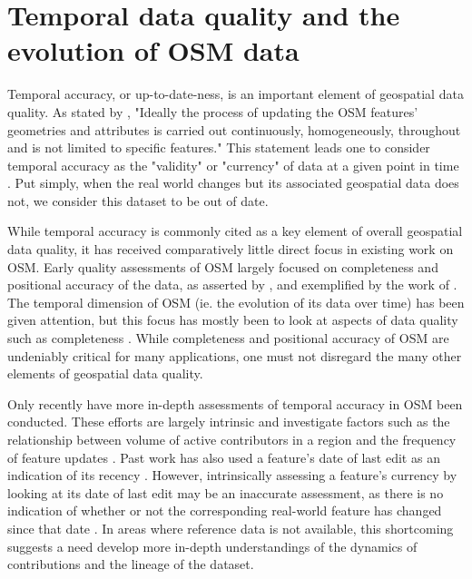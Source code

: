 \section{Temporal data quality and the evolution of OSM data}

Temporal accuracy, or up-to-date-ness, is an important element of geospatial data quality. As stated by \textcite[p. 884]{barron_comprehensive_2014}, "Ideally the process of updating the OSM features’ geometries and attributes is carried out continuously, homogeneously, throughout and is not limited to speciﬁc features." This statement leads one to consider temporal accuracy as the "validity" or "currency" of data at a given point in time \parencite[p. 17]{van_oort_spatial_2006}. Put simply, when the real world changes but its associated geospatial data does not, we consider this dataset to be out of date.	

While temporal accuracy is commonly cited as a key element of overall geospatial data quality, it has received comparatively little direct focus in existing work on OSM. Early quality assessments of OSM largely focused on completeness and positional accuracy of the data, as asserted by \textcite[p.83]{neis_recent_2014}, and exemplified by the work of \textcite{haklay_how_2010-1, haklay_how_2010, helbich_comparative_2012}. The temporal dimension of OSM (ie. the evolution of its data over time) has been given attention, but this focus has mostly been to look at aspects of data quality such as completeness \parencite{grochenig_estimating_2014}. While completeness and positional accuracy of OSM are undeniably critical for many applications, one must not disregard the many other elements of geospatial data quality. 

Only recently have more in-depth assessments of temporal accuracy in OSM been conducted. These efforts are largely intrinsic and investigate factors such as the relationship between volume of active contributors in a region and the frequency of feature updates \parencite{girres_quality_2010}. Past work has also used a feature's date of last edit as an indication of its recency \parencite{minghini_open_2018, roick_technical_2012}. However, intrinsically assessing a feature’s currency by looking at its date of last edit may be an inaccurate assessment, as there is no indication of whether or not the corresponding real-world feature has changed since that date \parencite{barron_comprehensive_2014}. In areas where reference data is not available, this shortcoming suggests a need develop more in-depth understandings of the dynamics of contributions and the lineage of the dataset. 

